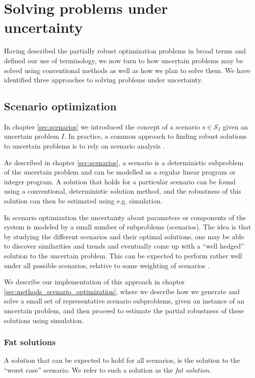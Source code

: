 \chapter{Solving problems under uncertainty}
\label{sec:solving_problems_under_uncertainty}

Having described the partially robust optimization problems in broad terms and
defined our use of terminology, we now turn to how uncertain problems
may be solved using conventional methods as well as how we plan to
solve them. We have identified three approaches to solving problems
under uncertainty.

\section{Scenario optimization}
\label{sec:scenario_optimization}

In chapter \ref{sec:scenarios} we introduced the concept of a scenario
$s \in \mathcal{S}_I$ given an uncertain problem $I$. In practice, a
common approach to finding robust solutions to uncertain problems is
to rely on scenario analysis \cite{rockafellar}. 

As described in chapter \ref{sec:scenarios}, a scenario is a
deterministic subproblem of the uncertain problem and can be modelled
as a regular linear program or integer program. A solution that holds
for a particular scenario can be found using a conventional,
deterministic solution method, and the robustness of this solution can
then be estimated using e.g. simulation.

In scenario optimization the uncertainty about parameters or
components of the system is modeled by a small number of subproblems
(scenarios). The idea is that by studying the different scenarios and
their optimal solutions, one may be able to discover similarities and
trends and eventually come up with a ``well hedged'' solution to the
uncertain problem. This can be expected to perform rather
well under all possible scenarios, relative to some weighting of scenarios
\cite{rockafellar}.

We describe our implementation of this approach in chapter
\ref{sec:methods_scenario_optimization}, where we describe how we
generate and solve a small set of representative scenario subproblems,
given an instance of an uncertain problem, and then proceed to
estimate the partial robustness of these solutions using simulation.

\subsection{Fat solutions}
\label{sec:fat_solutions}
A solution that can be expected to hold for all scenarios, is the
solution to the ``worst case'' scenario. We refer to such a solution
as the \emph{fat solution}.

